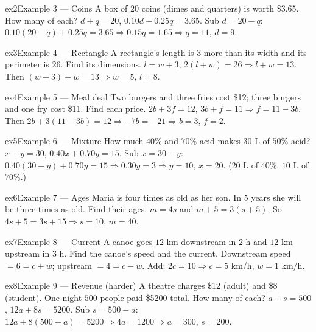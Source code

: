 \documentclass[11pt]{article}
\begin{document}
\begin{example}{ex2}{Example 3 --- Coins}
A box of $20$ coins (dimes and quarters) is worth \$3.65. How many of each?
\soln $d+q=20$, $0.10d+0.25q=3.65$. Sub $d=20-q$: $0.10(20-q)+0.25q=3.65\Rightarrow 0.15q=1.65\Rightarrow q=11$, $d=9$.
\end{example}

\begin{example}{ex3}{Example 4 --- Rectangle}
A rectangle's length is $3$ more than its width and its perimeter is $26$. Find its dimensions.
\soln $l=w+3$, $2(l+w)=26\Rightarrow l+w=13$. Then $(w+3)+w=13\Rightarrow w=5$, $l=8$.
\end{example}

\begin{example}{ex4}{Example 5 --- Meal deal}
Two burgers and three fries cost \$12; three burgers and one fry cost \$11. Find each price.
\soln $2b+3f=12$, $3b+f=11\Rightarrow f=11-3b$. Then $2b+3(11-3b)=12\Rightarrow -7b=-21\Rightarrow b=3$, $f=2$.
\end{example}

\begin{example}{ex5}{Example 6 --- Mixture}
How much $40\%$ and $70\%$ acid makes $30$ L of $50\%$ acid?
\soln $x+y=30$, $0.40x+0.70y=15$. Sub $x=30-y$: $0.40(30-y)+0.70y=15\Rightarrow 0.30y=3\Rightarrow y=10$, $x=20$. ($20$ L of $40\%$, $10$ L of $70\%$.)
\end{example}

\begin{example}{ex6}{Example 7 --- Ages}
Maria is four times as old as her son. In $5$ years she will be three times as old. Find their ages.
\soln $m=4s$ and $m+5=3(s+5)$. So $4s+5=3s+15\Rightarrow s=10$, $m=40$.
\end{example}

\begin{example}{ex7}{Example 8 --- Current}
A canoe goes $12$ km downstream in $2$ h and $12$ km upstream in $3$ h. Find the canoe's speed and the current.
\soln Downstream speed $=6=c+w$; upstream $=4=c-w$. Add: $2c=10\Rightarrow c=5$ km/h, $w=1$ km/h.
\end{example}

\begin{example}{ex8}{Example 9 --- Revenue (harder)}
A theatre charges \$12 (adult) and \$8 (student). One night $500$ people paid \$5200 total. How many of each?
\soln $a+s=500$, $12a+8s=5200$. Sub $s=500-a$: $12a+8(500-a)=5200\Rightarrow 4a=1200\Rightarrow a=300$, $s=200$.
\end{example}
\end{document}
